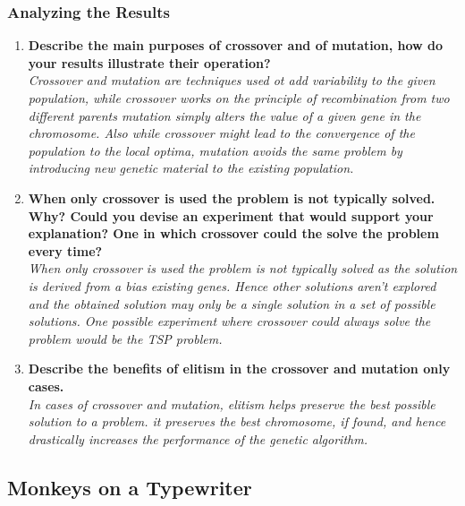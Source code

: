 \documentclass{article}
\begin{document}
\subsubsection{Analyzing the Results}
\begin{enumerate}
	\item \textbf{Describe the main purposes of crossover and of mutation, how do your results illustrate their operation?} \\
\textit{
 \color{blue}Crossover and mutation are techniques used ot add variability to the given population, while crossover works on the principle of recombination from two different parents mutation simply alters the value of a given gene in the chromosome. Also while crossover might lead to the convergence of the population to the local optima, mutation avoids the same problem by introducing new genetic material to the existing population.
 }

	\item \textbf{When only crossover is used the problem is not typically solved. Why? Could you devise an experiment that would support your explanation? One in which crossover could the solve the problem every time?}\\
\textit{
\color{blue}When only crossover is used the problem is not typically solved as the solution is derived from a bias existing genes. Hence other solutions aren't explored and the obtained solution may only be a single solution in a set of possible solutions. One possible experiment where crossover could always solve the problem would be the TSP problem.
 }
	
	\item \textbf{Describe the benefits of elitism in the crossover and mutation only cases.}\\
\textit{
\color{blue}In cases of crossover and mutation, elitism helps preserve the best possible solution to a problem. it preserves the best chromosome, if found, and hence drastically increases the performance of the  genetic algorithm.
}

\end{enumerate}

\newpage
\subsection{Monkeys on a Typewriter}
\end{document}
